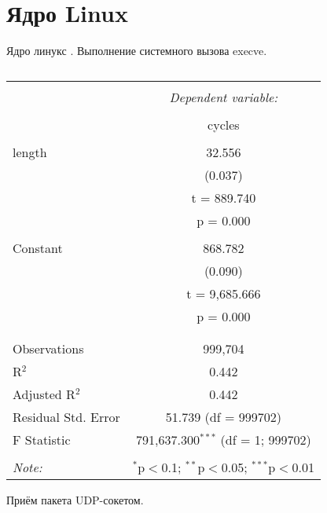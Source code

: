 \section{Ядро Linux}

Ядро линукс \cite{gonchar}. Выполнение системного вызова execve.

\begin{table}[!htbp] \centering 
  \caption{} 
  \label{} 
\begin{tabular}{@{\extracolsep{5pt}}lc} 
\\[-1.8ex]\hline 
\hline \\[-1.8ex] 
 & \multicolumn{1}{c}{\textit{Dependent variable:}} \\ 
\cline{2-2} 
\\[-1.8ex] & cycles \\ 
\hline \\[-1.8ex] 
 length & 32.556 \\ 
  & (0.037) \\ 
  & t = 889.740 \\ 
  & p = 0.000 \\ 
  & \\ 
 Constant & 868.782 \\ 
  & (0.090) \\ 
  & t = 9,685.666 \\ 
  & p = 0.000 \\ 
  & \\ 
\hline \\[-1.8ex] 
Observations & 999,704 \\ 
R$^{2}$ & 0.442 \\ 
Adjusted R$^{2}$ & 0.442 \\ 
Residual Std. Error & 51.739 (df = 999702) \\ 
F Statistic & 791,637.300$^{***}$ (df = 1; 999702) \\ 
\hline 
\hline \\[-1.8ex] 
\textit{Note:}  & \multicolumn{1}{r}{$^{*}$p$<$0.1; $^{**}$p$<$0.05; $^{***}$p$<$0.01} \\ 
\end{tabular} 
\end{table} 

Приём пакета UDP-сокетом.

\clearpage
